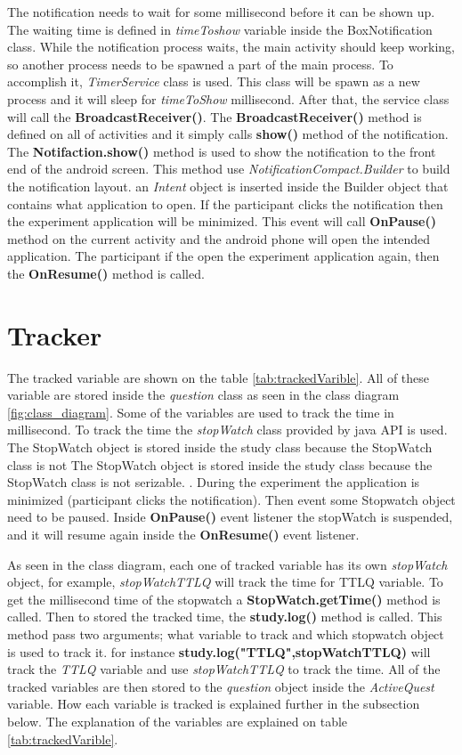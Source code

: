 The notification needs to wait for some millisecond before it can be shown up. The waiting time is defined in \textit{timeToshow} variable inside the BoxNotification class.
While the notification process waits, the main activity should keep working, so another process needs to be spawned a part of the main process.
To accomplish it, \textit{TimerService} class is used. This class will be spawn as a new process and it will sleep for \textit{timeToShow} millisecond.
After that, the service class will call the \textbf{BroadcastReceiver()}.
The \textbf{BroadcastReceiver()} method  is defined on all of activities and it simply calls \textbf{show()} method of the notification.
The \textbf{Notifaction.show()} method is used to show the notification to the front end of the android screen. This method use
 \textit{NotificationCompact.Builder} to build the notification layout.
 an \textit{Intent} object is inserted inside the Builder object that contains what application to open.
 If the participant clicks the notification then the experiment application will be minimized.
 This event will call \textbf{OnPause()} method on the current activity and the android phone will open the intended application.
 The participant if the open the experiment application again, then the \textbf{OnResume()} method is called.


\section{Tracker}

The tracked variable are shown on the table \ref{tab:trackedVarible}.
All of these variable are stored inside the \textit{question} class as seen in the class diagram \ref{fig:class_diagram}.
Some of the variables are used to track the time in millisecond.
To track the time the \textit{stopWatch} class provided by java API is used.
The StopWatch object is stored inside the study class because the StopWatch class is not The StopWatch object is stored inside the study class because the StopWatch class is not serizable.
.
During the experiment the application is minimized (participant clicks the notification).
Then event some Stopwatch object need to be paused. Inside \textbf{OnPause()} event listener the stopWatch is suspended,
and it will resume again inside the \textbf{OnResume()} event listener.

As seen in the class diagram, each one of tracked variable has its own \textit{stopWatch} object, for example, \textit{stopWatchTTLQ} will track the time for TTLQ variable.
To get the millisecond time of the stopwatch a \textbf{StopWatch.getTime()} method is called.
Then to stored the tracked time, the \textbf{study.log()} method is called.
This method pass two arguments; what variable to track and which stopwatch object is used to track it.
for instance \textbf{study.log("TTLQ",stopWatchTTLQ)} will track the \textit{TTLQ} variable and use \textit{stopWatchTTLQ} to track the time.
All of the tracked variables are then stored to the \textit{question} object inside the \textit{ActiveQuest} variable.
How each variable is tracked is explained further in the subsection below.
The explanation of the variables are explained on table \ref{tab:trackedVarible}.

